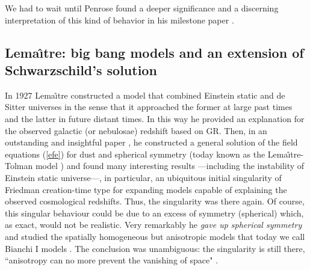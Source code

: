 \documentclass[12pt]{iopart}
\begin{document}
We had to wait until Penrose found a deeper significance and a discerning interpretation of this kind of behavior in his milestone paper \cite{P}.


\subsection{Lema\^{\i}tre: big bang models and an extension of Schwarzschild's solution}
In 1927 Lema\^{\i}tre \cite{Lem} constructed a model that combined Einstein static and de Sitter universes in the sense that it approached the former at large past times and the latter in future distant times. In this way he provided an 
explanation for the observed galactic (or nebulosae) redshift based on GR. Then, in an outstanding and insightful paper \cite{L}, he constructed a general solution of the field equations (\ref{efe}) for dust and spherical symmetry (today known as the Lema\^\i tre-Tolman model \cite{Kra}) and found many interesting results ---including the instability of Einstein static universe---, in particular, an ubiquitous initial singularity of Friedman creation-time type for expanding models capable of explaining the observed cosmological redshifts. Thus, the singularity was there again. Of course, this singular behaviour  could be due to an excess of symmetry (spherical) which, as exact, would not be realistic. Very remarkably he {\em gave up spherical symmetry} and studied the spatially homogeneous but anisotropic models that today we call Bianchi I models \cite{RSh,Exact}. The conclusion was 
unambiguous: the singularity is still there, ``anisotropy can no more prevent the vanishing of space" \cite{L}.
\end{document}
